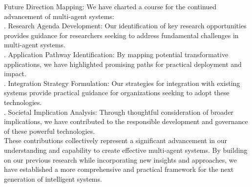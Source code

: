 Future Direction Mapping: We have charted a course for the continued advancement of multi-agent systems:\\ . Research Agenda Development: Our identification of key research opportunities provides guidance for researchers seeking to address fundamental challenges in multi-agent systems.\\ . Application Pathway Identification: By mapping potential transformative applications, we have highlighted promising paths for practical deployment and impact.\\ . Integration Strategy Formulation: Our strategies for integration with existing systems provide practical guidance for organizations seeking to adopt these technologies.\\ . Societal Implication Analysis: Through thoughtful consideration of broader implications, we have contributed to the responsible development and governance of these powerful technologies.\\ \newline
These contributions collectively represent a significant advancement in our understanding and capability to create effective multi-agent systems. By building on our previous research while incorporating new insights and approaches, we have established a more comprehensive and practical framework for the next generation of intelligent systems.\\
